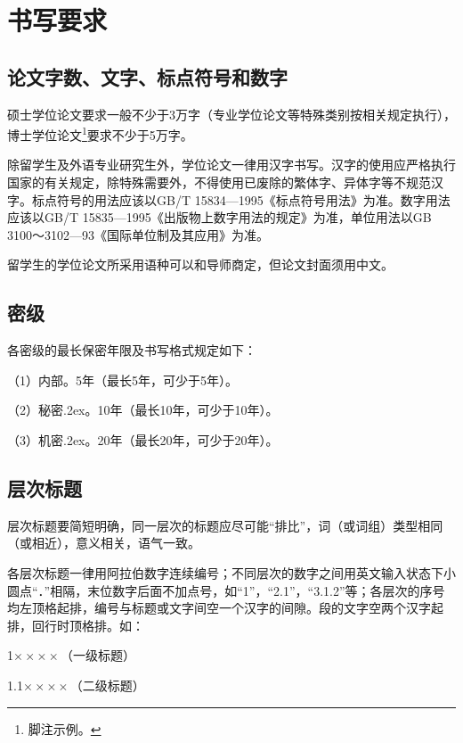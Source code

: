 
\chapter{书写要求}
\label{shuxieyaoqiu}
\section{论文字数、文字、标点符号和数字}

硕士学位论文要求一般不少于3万字（专业学位论文等特殊类别按相关规定执行），博士学位论文\footnote{脚注示例。}要求不少于5万字。

除留学生及外语专业研究生外，学位论文一律用汉字书写。汉字的使用应严格执行国家的有关规定，除特殊需要外，不得使用已废除的繁体字、异体字等不规范汉字。标点符号的用法应该以GB/T 15834—1995《标点符号用法》为准。数字用法应该以GB/T 15835—1995《出版物上数字用法的规定》为准，单位用法以GB 3100～3102—93《国际单位制及其应用》为准。

留学生的学位论文所采用语种可以和导师商定，但论文封面须用中文。

\section{密级}

各密级的最长保密年限及书写格式规定如下：

（1）内部。5年（最长5年，可少于5年）。

（2）秘密\lower .2ex\hbox {\FiveStar}。10年（最长10年，可少于10年）。

（3）机密\lower .2ex\hbox {\FiveStar}。20年（最长20年，可少于20年）。

\section{层次标题}	

层次标题要简短明确，同一层次的标题应尽可能“排比”，词（或词组）类型相同（或相近），意义相关，语气一致。 

各层次标题一律用阿拉伯数字连续编号；不同层次的数字之间用英文输入状态下小圆点“．”相隔，末位数字后面不加点号，如“1”，“2.1”，“3.1.2”等；各层次的序号均左顶格起排，编号与标题或文字间空一个汉字的间隙。段的文字空两个汉字起排，回行时顶格排。如：

1\hspace{\ccwd}$\times\times\times\times$（一级标题）

1.1\hspace{\ccwd}$\times\times\times\times$（二级标题）

